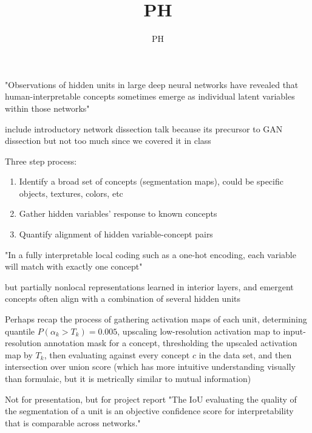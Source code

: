 \documentclass[12pt]{beamer}
\title{PH}
\author{PH}
\date{}
\begin{document}
\maketitle

\begin{frame}
"Observations of hidden units in large deep neural networks have revealed that human-interpretable concepts sometimes emerge as individual latent variables within those networks"

include introductory network dissection talk because its precursor to GAN dissection but not too much since we covered it in class
\end{frame}

\begin{frame}
Three step process:
\begin{enumerate}
\item Identify a broad set of concepts (segmentation maps), could be specific objects, textures, colors, etc
\item Gather hidden variables' response to known concepts
\item Quantify alignment of hidden variable-concept pairs
\end{enumerate}

"In a fully interpretable local coding such as a one-hot encoding, each variable will match with exactly one concept"

but partially nonlocal representations learned in interior layers, and emergent concepts often align with a combination of several hidden units

\end{frame}

\begin{frame}
Perhaps recap the process of gathering activation maps of each unit, determining quantile $P(\alpha_k > T_k) = 0.005$, upscaling low-resolution activation map to input-resolution annotation mask for a concept, thresholding the upscaled activation map by $T_k$, then evaluating against every concept $c$ in the data set, and then intersection over union score (which has more intuitive understanding visually than formulaic, but it is metrically similar to mutual information)
\end{frame}

Not for presentation, but for project report 
"The IoU evaluating the quality of the segmentation of a unit is an objective confidence score for interpretability that is comparable across networks."
\end{document}

